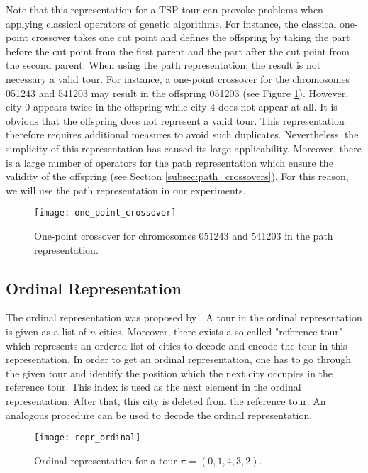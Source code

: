 Note that this representation for a TSP tour can provoke problems when applying classical operators of genetic algorithms. For instance, the classical one-point crossover takes one cut point and defines the offspring by taking the part before the cut point from the first parent and the part after the cut point from the second parent. When using the path representation, the result is not necessary a valid tour.  For instance, a one-point crossover for the chromosomes 051243 and 541203 may result in the offspring 051203 (see Figure \ref{one_point_crossover}).  However, city 0 appears twice in the offspring while city 4 does not appear at all. It is obvious that the offspring does not represent a valid tour. This representation therefore requires additional measures to avoid such duplicates. Nevertheless, the simplicity of this representation has caused its large applicability. Moreover, there is a large number of operators for the path representation which ensure the validity of the offspring (see Section \ref{subsec:path_crossovers}). For this reason, we will use the path representation in our experiments.

\begin{figure}[htp] \centering
	\centering
	\texttt{[image: one\_point\_crossover]}
	\caption{One-point crossover for chromosomes 051243 and 541203 in the path representation.}
	\label{one_point_crossover}
\end{figure}

\subsection{Ordinal Representation}
\label{subsec:ordinal}

The ordinal representation was proposed by \citeauthor{grefenstette1985genetic} \cite{grefenstette1985genetic}. A tour in the ordinal representation is given as a list of $n$ cities. Moreover, there exists a so-called "reference tour" which represents an ordered list of cities to decode and encode the tour in this representation. In order to get an ordinal representation, one has to go through the given tour and identify the position which the next city occupies in the reference tour. This index is used as the next element in the ordinal representation. After that, this city is deleted from the reference tour. An analogous procedure can be used to decode the ordinal representation.\par

\begin{figure}[htp] \centering
	\centering
	\texttt{[image: repr\_ordinal]}
	\caption{Ordinal representation for a tour $\pi = (0, 1, 4, 3, 2)$.}
	\label{repr_ordinal}
\end{figure}


